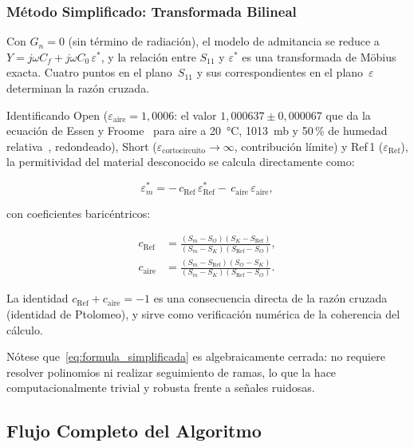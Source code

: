 \subsubsection{Método Simplificado: Transformada Bilineal}
\label{sec:extraccion_simplificado}

Con $G_n = 0$ (sin término de radiación), el modelo de admitancia se reduce a
$Y = j\omega C_f + j\omega C_0\,\varepsilon^*$, y la relación entre $S_{11}$ y
$\varepsilon^*$ es una transformada de Möbius exacta. Cuatro puntos en el
plano~$S_{11}$ y sus correspondientes en el plano~$\varepsilon$ determinan la
razón cruzada.

Identificando Open ($\varepsilon_{\text{aire}} = 1{,}0006$: el valor
$1{,}000637 \pm 0{,}000067$ que da la ecuación de Essen y Froome~\cite{essen1951}
para aire a 20~°C, 1013~mb y 50\,\% de humedad relativa~\cite{medley1991},
redondeado), Short
($\varepsilon_{\text{cortocircuito}} \to \infty$, contribución límite) y
Ref\,1 ($\varepsilon_{\text{Ref}}$), la permitividad del material desconocido
se calcula directamente como:

\begin{equation}
    \varepsilon_m^*
    = -\,c_{\text{Ref}}\,\varepsilon_{\text{Ref}}^*
      -\,c_{\text{aire}}\,\varepsilon_{\text{aire}},
    \label{eq:formula_simplificada}
\end{equation}

\noindent con coeficientes baricéntricos:

\begin{align}
    c_{\text{Ref}}  &= \frac{(S_m - S_O)(S_K - S_{\text{Ref}})}{(S_m - S_K)(S_{\text{Ref}} - S_O)},
    \label{eq:c_ref} \\[4pt]
    c_{\text{aire}} &= \frac{(S_m - S_{\text{Ref}})(S_O - S_K)}{(S_m - S_K)(S_{\text{Ref}} - S_O)}.
    \label{eq:c_aire}
\end{align}

La identidad $c_{\text{Ref}} + c_{\text{aire}} = -1$ es una consecuencia
directa de la razón cruzada (identidad de Ptolomeo), y sirve como verificación
numérica de la coherencia del cálculo.

Nótese que~\eqref{eq:formula_simplificada} es algebraicamente cerrada: no
requiere resolver polinomios ni realizar seguimiento de ramas, lo que la hace
computacionalmente trivial y robusta frente a señales ruidosas.

\newpage
\Encabezado

\subsection{Flujo Completo del Algoritmo}
\label{sec:flujo}

